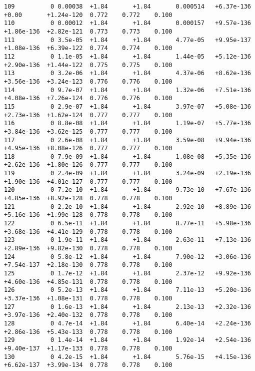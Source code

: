 \documentclass[12pt]{article}
\numberwithin{equation}{section}
\begin{document}
\begin{lstlisting}
109          0 0.00038  +1.84       +1.84       0.000514   +6.37e-136  +0.00       +1.24e-120  0.772    0.772    0.100
110          0 0.00012  +1.84       +1.84       0.000157   +9.57e-136  +1.86e-136  +2.82e-121  0.773    0.773    0.100
111          0 3.5e-05  +1.84       +1.84       4.77e-05   +9.95e-137  +1.08e-136  +6.39e-122  0.774    0.774    0.100
112          0 1.1e-05  +1.84       +1.84       1.44e-05   +5.12e-136  +2.90e-136  +1.44e-122  0.775    0.775    0.100
113          0 3.2e-06  +1.84       +1.84       4.37e-06   +8.62e-136  +3.56e-136  +3.24e-123  0.776    0.776    0.100
114          0 9.7e-07  +1.84       +1.84       1.32e-06   +7.51e-136  +4.08e-136  +7.26e-124  0.776    0.776    0.100
115          0 2.9e-07  +1.84       +1.84       3.97e-07   +5.08e-136  +2.73e-136  +1.62e-124  0.777    0.777    0.100
116          0 8.8e-08  +1.84       +1.84       1.19e-07   +5.77e-136  +3.84e-136  +3.62e-125  0.777    0.777    0.100
117          0 2.6e-08  +1.84       +1.84       3.59e-08   +9.94e-136  +4.95e-136  +8.08e-126  0.777    0.777    0.100
118          0 7.9e-09  +1.84       +1.84       1.08e-08   +5.35e-136  +2.62e-136  +1.80e-126  0.777    0.777    0.100
119          0 2.4e-09  +1.84       +1.84       3.24e-09   +2.19e-136  +1.90e-136  +4.01e-127  0.777    0.777    0.100
120          0 7.2e-10  +1.84       +1.84       9.73e-10   +7.67e-136  +4.85e-136  +8.92e-128  0.778    0.778    0.100
121          0 2.2e-10  +1.84       +1.84       2.92e-10   +8.89e-136  +5.16e-136  +1.99e-128  0.778    0.778    0.100
122          0 6.5e-11  +1.84       +1.84       8.77e-11   +5.98e-136  +3.68e-136  +4.41e-129  0.778    0.778    0.100
123          0 1.9e-11  +1.84       +1.84       2.63e-11   +7.13e-136  +2.89e-136  +9.82e-130  0.778    0.778    0.100
124          0 5.8e-12  +1.84       +1.84       7.90e-12   +3.06e-136  +7.54e-137  +2.18e-130  0.778    0.778    0.100
125          0 1.7e-12  +1.84       +1.84       2.37e-12   +9.92e-136  +4.60e-136  +4.85e-131  0.778    0.778    0.100
126          0 5.2e-13  +1.84       +1.84       7.11e-13   +5.20e-136  +3.37e-136  +1.08e-131  0.778    0.778    0.100
127          0 1.6e-13  +1.84       +1.84       2.13e-13   +2.32e-136  +3.97e-136  +2.40e-132  0.778    0.778    0.100
128          0 4.7e-14  +1.84       +1.84       6.40e-14   +2.24e-136  +2.86e-136  +5.43e-133  0.778    0.778    0.100
129          0 1.4e-14  +1.84       +1.84       1.92e-14   +2.54e-136  +9.40e-137  +1.17e-133  0.778    0.778    0.100
130          0 4.2e-15  +1.84       +1.84       5.76e-15   +4.15e-136  +6.62e-137  +3.99e-134  0.778    0.778    0.100

\end{lstlisting}
\end{document}
